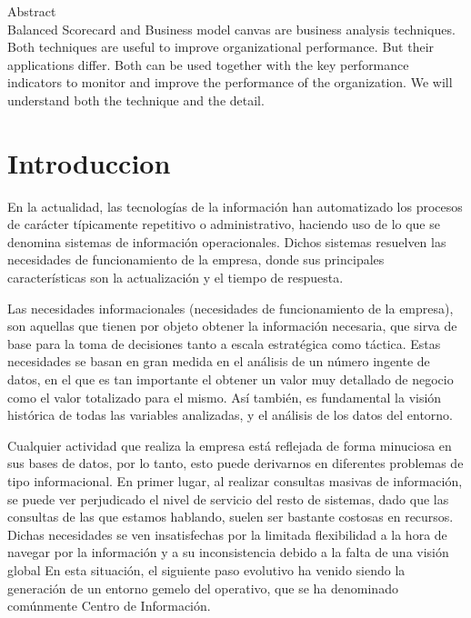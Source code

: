 


 Abstract\\
Balanced Scorecard and Business model canvas are business analysis techniques. Both techniques are useful to improve organizational performance. But their applications differ. Both can be used together with the key performance indicators to monitor and improve the performance of the organization. We will understand both the technique and the detail.
\newpage

\section{Introduccion}
En la actualidad, las tecnologías de la información han automatizado los procesos de carácter típicamente repetitivo o administrativo, haciendo uso de lo que se denomina sistemas de información operacionales. Dichos sistemas resuelven las necesidades de funcionamiento de la empresa, donde sus principales características son la actualización y el tiempo de respuesta. 

Las necesidades informacionales (necesidades de funcionamiento de la empresa), son aquellas que tienen por objeto obtener la información necesaria, que sirva de base para la toma de decisiones tanto a escala estratégica como táctica. Estas necesidades se basan en gran medida en el análisis de un número ingente de datos, en el que es tan importante el obtener un valor muy detallado de negocio como el valor totalizado para el mismo. Así también, es fundamental la visión histórica de todas las variables analizadas, y el análisis de los datos del entorno. 

Cualquier actividad que realiza la empresa está reflejada de forma minuciosa en sus bases de datos, por lo tanto, esto puede derivarnos en diferentes problemas de tipo informacional. En primer lugar, al realizar consultas masivas de información, se puede ver perjudicado el nivel de servicio del resto de sistemas, dado que las consultas de las que estamos hablando, suelen ser bastante costosas en recursos. Dichas necesidades se ven insatisfechas por la limitada flexibilidad a la hora de navegar por la información y a su inconsistencia debido a la falta de una visión global En esta situación, el siguiente paso evolutivo ha venido siendo la generación de un entorno gemelo del operativo, que se ha denominado comúnmente Centro de Información. 

